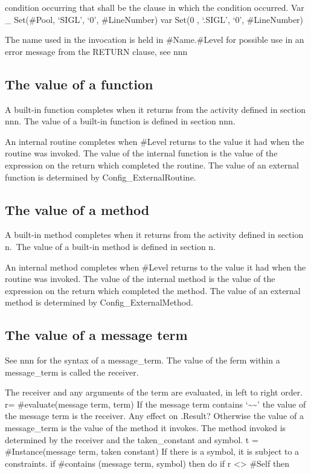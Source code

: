 condition occurring that shall be the clause in which the condition
occurred. Var \_ Set(\#Pool, `SIGL', `0', \#LineNumber) var Set(0 ,
`.SIGL', `0', \#LineNumber)

The name used in the invocation is held in \#Name.\#Level for possible
use in an error message from the RETURN clause, see nnn

\hypertarget{the-value-of-a-function}{%
\subsection{The value of a function}\label{the-value-of-a-function}}

A built-in function completes when it returns from the activity defined
in section nnn. The value of a built-in function is defined in section
nnn.

An internal routine completes when \#Level returns to the value it had
when the routine was invoked. The value of the internal function is the
value of the expression on the return which completed the routine. The
value of an external function is determined by Config\_ExternalRoutine.

\hypertarget{the-value-of-a-method}{%
\subsection{The value of a method}\label{the-value-of-a-method}}

A built-in method completes when it returns from the activity defined in
section n.~The value of a built-in method is defined in section n.

An internal method completes when \#Level returns to the value it had
when the routine was invoked. The value of the internal method is the
value of the expression on the return which completed the method. The
value of an external method is determined by Config\_ExternalMethod.

\hypertarget{the-value-of-a-message-term}{%
\subsection{The value of a message
term}\label{the-value-of-a-message-term}}

See nnn for the syntax of a message\_term. The value of the ferm within
a message\_term is called the receiver.

The receiver and any arguments of the term are evaluated, in left to
right order. r= \#evaluate(message term, term) If the message term
contains `\textasciitilde\textasciitilde{}' the value of the message
term is the receiver. Any effect on .Result? Otherwise the value of a
message\_term is the value of the method it invokes. The method invoked
is determined by the receiver and the taken\_constant and symbol. t =
\#Instance(message term, taken constant) If there is a symbol, it is
subject to a constraints. if \#contains (message term, symbol) then do
if r \textless\textgreater{} \#Self then

